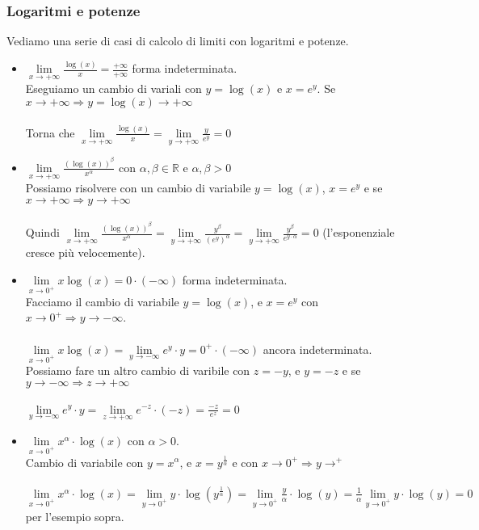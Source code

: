 \subsubsection{Logaritmi e potenze}
Vediamo una serie di casi di calcolo di limiti con logaritmi e potenze.
\begin{itemize}
    \item $\lim\limits_{x\to +\infty}\frac{\log(x)}{x} = \frac{+\infty}{+\infty}$ forma indeterminata.\\
    Eseguiamo un cambio di variali con $y = \log(x)$ e $x = e^y$. Se $x\to +\infty \Longrightarrow y = \log(x) \to +\infty$\\\\
    Torna che $\lim\limits_{x \to +\infty}\frac{\log(x)}{x} = \lim\limits_{y\to +\infty}\frac{y}{e^y} = 0$
    \item $\lim\limits_{x\to +\infty}\frac{(\log(x))^\beta}{x^\alpha}$ con $\alpha, \beta \in \mathbb{R}$ e $\alpha, \beta > 0$\\
    Possiamo risolvere con un cambio di variabile $y = \log(x)$, $x = e^y$ e se $x \to +\infty \Longrightarrow y\to +\infty$\\\\
    Quindi $\lim\limits_{x\to +\infty}\frac{(\log(x))^\beta}{x^\alpha} = \lim\limits_{y \to +\infty}\frac{y^\beta}{(e^y)^\alpha} = \lim\limits_{y \to +\infty}\frac{y^\beta}{e^{y\cdot\alpha}} = 0$  (l'esponenziale cresce più velocemente).
    \item $\lim\limits_{x\to 0^+}x\log(x) = 0 \cdot (-\infty)$ forma indeterminata.\\
    Facciamo il cambio di variabile $y = \log(x)$, e $x = e^y$ con $x\to 0^+ \Longrightarrow y\to -\infty$.\\\\
    $\lim\limits_{x\to 0^+}x\log(x) = \lim\limits_{y\to -\infty}e^y \cdot y = 0^+ \cdot (-\infty)$ ancora indeterminata.\\
    Possiamo fare un altro cambio di varibile con $z = -y$, e $y = -z$ e se $y \to -\infty \Longrightarrow z \to +\infty$\\\\
    $\lim\limits_{y\to -\infty}e^y \cdot y = \lim\limits_{z\to +\infty}e^{-z} \cdot (-z) = \frac{-z}{e^z} = 0$
    \item $\lim\limits_{x\to 0^+}x^\alpha \cdot \log(x)$ con $\alpha > 0$.\\
    Cambio di variabile con $y = x^\alpha$, e $x = y^{\frac{1}{\alpha}}$ e con $x\to 0^+ \Longrightarrow y\to^+$\\\\
    $\lim\limits_{x\to 0^+}x^\alpha \cdot \log(x) = \lim\limits_{y\to 0^+}y \cdot \log(y^{\frac{1}{\alpha}}) = \lim\limits_{y\to 0^+}\frac{y}{\alpha} \cdot \log(y) = \frac{1}{\alpha}\lim\limits_{y\to 0^+} y \cdot \log(y) = 0$ per l'esempio sopra.
\end{itemize}

